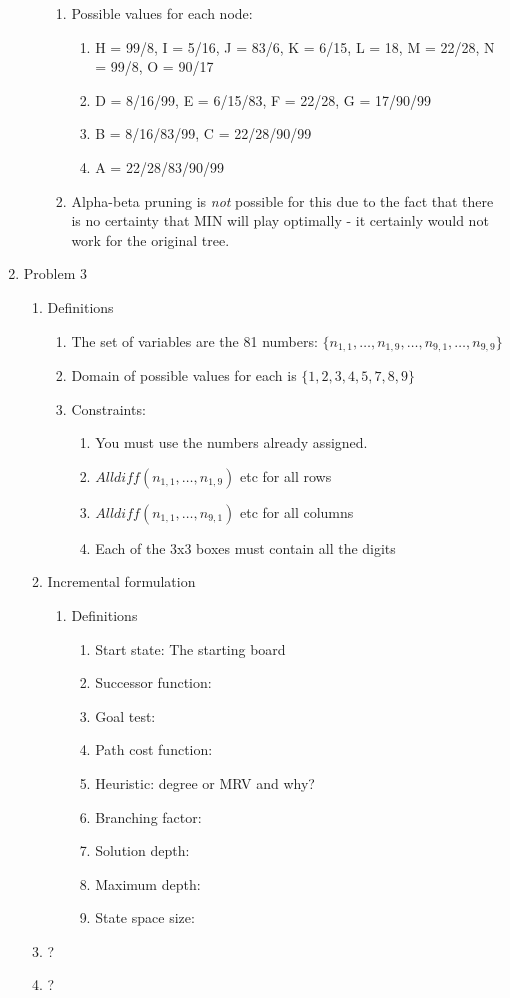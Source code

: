 \documentclass[11pt]{article}
\begin{document}
\begin{enumerate}
\begin{enumerate}
\begin{enumerate}
\item Possible values for each node:
\begin{enumerate}
\item H = 99/8, I = 5/16, J = 83/6, K = 6/15, L = 18, M = 22/28, N = 99/8, O = 90/17
\item D = 8/16/99, E = 6/15/83, F = 22/28, G = 17/90/99
\item B = 8/16/83/99, C = 22/28/90/99
\item A = 22/28/83/90/99
\end{enumerate}
\item Alpha-beta pruning is \textit{not} possible for this due to the fact that there is no certainty that MIN will play optimally - it certainly would not work for the original tree.
\end{enumerate}
\end{enumerate}

\item Problem 3
\begin{enumerate}
\item Definitions
\begin{enumerate}
\item The set of variables are the 81 numbers: $\{n_{1,1}, \ldots, n_{1,9}, \ldots, n_{9, 1}, \ldots, n_{9, 9}\}$
\item Domain of possible values for each is $\{1, 2, 3, 4, 5, 7, 8, 9\}$
\item Constraints:
\begin{enumerate}
\item You must use the numbers already assigned.
\item $Alldiff( n_{1,1}, \ldots, n_{1, 9} )$ etc for all rows
\item $Alldiff( n_{1,1}, \ldots, n_{9, 1} )$ etc for all columns
\item Each of the 3x3 boxes must contain all the digits
\end{enumerate}
\end{enumerate}
\item Incremental formulation
\begin{enumerate}
\item Definitions
\begin{enumerate}
\item Start state: The starting board
\item Successor function:
\item Goal test:
\item Path cost function:
\item Heuristic: degree or MRV and why?
\item Branching factor:
\item Solution depth:
\item Maximum depth:
\item State space size:
\end{enumerate}
\end{enumerate}
\item ?
\item ?
\end{enumerate}


\end{enumerate}
\end{document}
